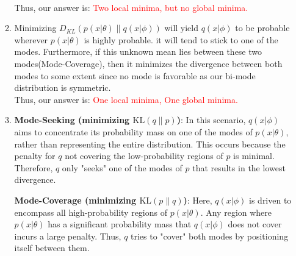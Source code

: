 \documentclass{article}
\begin{document}
\begin{enumerate}
\begin{enumerate}
        \\
        Thus, our answer is: 
        \textcolor{red}{Two local minima, but no global minima.} 
        \item 
        Minimizing $D_{KL} (p(x | \theta) \parallel q(x | \phi))$ will yield $q(x | \phi)$ to be probable wherever $p(x | \theta)$ is highly probable.
        it will tend to stick to one of the modes. Furthermore, if this unknown mean lies between these two modes(Mode-Coverage), then it minimizes the divergence between both modes to some extent since no mode is favorable as our bi-mode distribution is symmetric. \\
        Thus, our answer is: 
        \textcolor{red}{One local minima, One global minima.} 
        \item 
        \textbf{Mode-Seeking (minimizing \( \text{KL}(q \| p) \))}: In this scenario, \( q(x|\phi) \) aims to concentrate its probability mass on one of the modes of \( p(x|\theta) \), rather than representing the entire distribution. This occurs because the penalty for \( q \) not covering the low-probability regions of \( p \) is minimal. Therefore, \( q \) only "seeks" one of the modes of \( p \) that results in the lowest divergence.

        \textbf{Mode-Coverage (minimizing \( \text{KL}(p \| q) \))}: Here, \( q(x|\phi) \) is driven to encompass all high-probability regions of \( p(x|\theta) \). Any region where \( p(x|\theta) \) has a significant probability mass that \( q(x|\phi) \) does not cover incurs a large penalty. Thus, \( q \) tries to "cover" both modes by positioning itself between them.

    \end{enumerate}
\end{enumerate}
\end{document}

